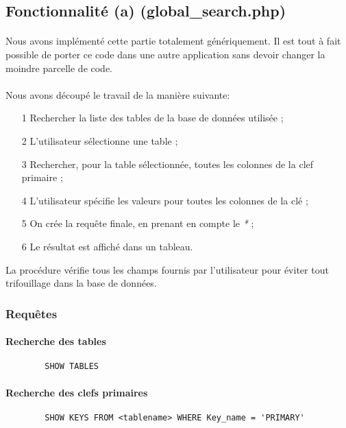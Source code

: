\documentclass[a4paper]{article}
\begin{document}
  \subsection{Fonctionnalité (a) (global\_search.php)}
    \paragraph{} Nous avons implémenté cette partie totalement génériquement.
Il est tout à fait possible de porter ce code dans une autre application sans
devoir changer la moindre parcelle de code.

    \paragraph{}Nous avons découpé le travail de la manière suivante:
    \begin{itemize}
        \item[1] Rechercher la liste des tables de la base de données utilisée ;
        \item[2] L'utilisateur sélectionne une table ;
        \item[3] Rechercher, pour la table sélectionnée, toutes les colonnes de
        la clef primaire ;
        \item[4] L'utilisateur spécifie les valeurs pour toutes les colonnes de
        la clé ;
        \item[5] On crée la requête finale, en prenant en compte le \textit{*} ;
        \item[6] Le résultat est affiché dans un tableau.
    \end{itemize}

        La procédure vérifie tous les champs fournis par l'utilisateur pour 
éviter tout trifouillage dans la base de données.

    \subsubsection{Requêtes}

    \paragraph{Recherche des tables}
    \begin{verbatim}
        SHOW TABLES
    \end{verbatim}

    \paragraph{Recherche des clefs primaires}
    \begin{verbatim}
        SHOW KEYS FROM <tablename> WHERE Key_name = 'PRIMARY'
    \end{verbatim}
\end{document}
